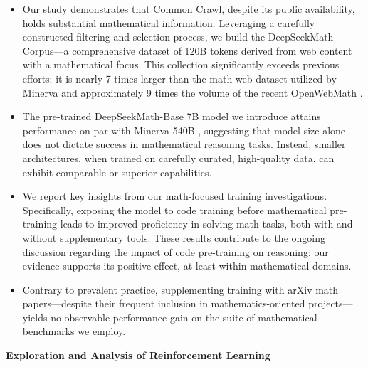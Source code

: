\begin{itemize}[topsep=0pt]
    \item Our study demonstrates that Common Crawl, despite its public availability, holds substantial mathematical information. Leveraging a carefully constructed filtering and selection process, we build the DeepSeekMath Corpus—a comprehensive dataset of 120B tokens derived from web content with a mathematical focus. This collection significantly exceeds previous efforts: it is nearly 7 times larger than the math web dataset utilized by Minerva \citep{minerva} and approximately 9 times the volume of the recent OpenWebMath \citep{openwebmath}.

    \item The pre-trained DeepSeekMath-Base 7B model we introduce attains performance on par with Minerva 540B \citep{minerva}, suggesting that model size alone does not dictate success in mathematical reasoning tasks. Instead, smaller architectures, when trained on carefully curated, high-quality data, can exhibit comparable or superior capabilities.

    \item We report key insights from our math-focused training investigations. Specifically, exposing the model to code training before mathematical pre-training leads to improved proficiency in solving math tasks, both with and without supplementary tools. These results contribute to the ongoing discussion regarding the impact of code pre-training on reasoning: our evidence supports its positive effect, at least within mathematical domains.

    \item Contrary to prevalent practice, supplementing training with arXiv math papers—despite their frequent inclusion in mathematics-oriented projects—yields no observable performance gain on the suite of mathematical benchmarks we employ.
\end{itemize}

\textbf{Exploration and Analysis of Reinforcement Learning}

